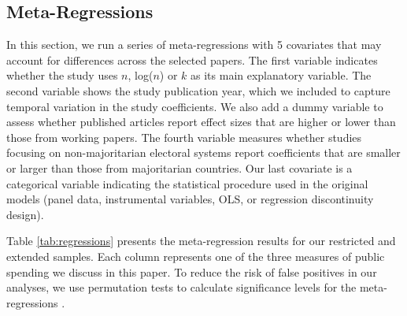 \documentclass[a4paper,12pt]{article}
\begin{document}
\subsection{Meta-Regressions}
\label{sub:regressions}

In this section, we run a series of meta-regressions with 5 covariates that may
account for differences across the selected papers. The first variable indicates
whether the study uses $n$, log($n$) or $k$ as its main explanatory variable.
The second variable shows the study publication year, which we included to
capture temporal variation in the study coefficients. We also add a dummy
variable to assess whether published articles report effect sizes that are
higher or lower than those from working papers. The fourth variable measures
whether studies focusing on non-majoritarian electoral systems report
coefficients that are smaller or larger than those from majoritarian countries.
Our last covariate is a categorical variable indicating the statistical
procedure used in the original models (panel data, instrumental variables,
OLS, or regression discontinuity design).

Table \ref{tab:regressions} presents the meta-regression results for our
restricted and extended samples. Each column represents one of the three
measures of public spending we discuss in this paper. To reduce the risk of
false positives in our analyses, we use permutation tests to calculate
significance levels for the meta-regressions \citep{higgins2004controlling}.

\vspace{.5cm}
\end{document}
